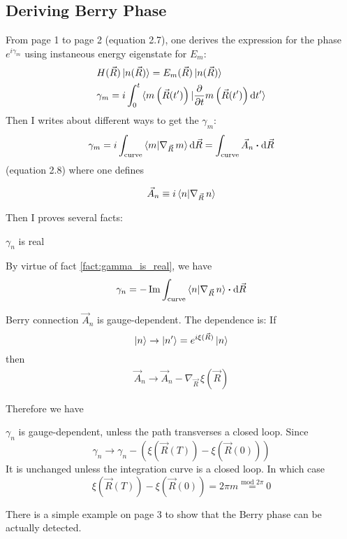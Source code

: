 
\subsection{Deriving Berry Phase}
\label{sec:Deriving-Berry-Phase}
From page 1 to page 2 (equation 2.7), one derives the expression for
the phase $e^{i\gamma_m}$ using instaneous energy eigenstate for
$E_m$:
\begin{align}
    & H(\vec{R})\ket{n(\vec{R})} = E_m(\vec{R})\ket{n(\vec{R})} \\
    & \gamma_m = i\int_0^t
    \braket{
        m\left(\vec{R}(t')\right)|\frac{\partial }{\partial t}
        m\left(\vec{R}(t')\right) \dd t' }
\end{align}
Then I writes about different ways to get the $\gamma_m$:
\begin{align}
    \gamma_m = i\int_{\text{curve}}\braket{m|\nabla_{\vec{R}}\, m }
    \dd \vec{R}
    = \int_{\text{curve}} \vec{A}_n \vdot\dd \vec{R}
\end{align}
(equation 2.8) 
where one defines
\begin{defi}
    \begin{align}
        \vec{A}_n \equiv i \braket{n|\nabla_{\vec{R}}\, n }
    \end{align}
\end{defi}
Then I proves several facts:
\begin{fact}
    \label{fact:gamma_is_real}
        $\gamma_n$ is real
\end{fact}
By virtue of fact \ref{fact:gamma_is_real}, we have
\begin{align}
    \gamma_n = -\Im \int_\text{curve} \braket{ n|\nabla_{\vec{R}}\,n}
    \vdot \dd \vec{R} 
\end{align}
\begin{fact}
    Berry connection $\vec{A}_n$ is gauge-dependent.
    The dependence is: If 
    $$\ket{n}\to \ket{n'}= e^{i\xi(\vec{R})}\ket{n}$$
    then
    \begin{align}
        \vec{A}_n \to \vec{A}_n - \nabla_{\vec{R}}\,\xi(\vec{R})
    \end{align}
\end{fact}
Therefore we have
\begin{fact}
    $\gamma_n$ is gauge-dependent, unless the path transverses a
    closed loop.
    Since 
    $$ \gamma_n \to \gamma_n - \left(\xi(\vec{R}(T))-
    \xi(\vec{R}(0)) \right) $$
    It is unchanged unless the integration curve is a closed loop. In
    which case
    $$\xi(\vec{R}(T)) - \xi(\vec{R}(0)) = 2\pi m
    \overset{\text{mod }2\pi}{=} 0 $$
\end{fact}
\begin{ex}
    There is a simple example on page 3 to show that the Berry phase
    can be actually detected.
\end{ex}

